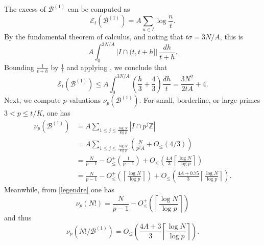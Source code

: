 \documentclass[12pt,a4paper,reqno]{amsart}
\numberwithin{equation}{section}
\theoremstyle{plain}
\theoremstyle{definition}
\newcommand\Z{\mathbb{Z}}
\newcommand\tuple{{\mathcal B}}
\newcommand\excess{{\mathcal{E}}}
\begin{document}
The excess of $\tuple^{(1)}$ can be computed as
$$ \excess_t(\tuple^{(1)}) = A \sum_{n \in I} \log \frac{n}{t}.$$
By the fundamental theorem of calculus, and noting that $t\sigma = 3N/A$, this is
$$ A \int_0^{3N/A} |I \cap (t, t+h]|\ \frac{dh}{t+h}.$$
Bounding $\frac{1}{t+h}$ by $\frac{1}{t}$ and applying , we conclude that
\begin{equation}\label{excess1-bound}
 \excess_t(\tuple^{(1)}) \leq A \int_0^{3N/A} \left(\frac{h}{3} + \frac{4}{3}\right) \frac{dh}{t} = \frac{3N^2}{2tA} + 4.
\end{equation}
Next, we compute $p$-valuations $\nu_p(\tuple^{(1)})$.  For small, borderline, or large primes $3 < p \leq t/K$, one has
\begin{align*}
  \nu_p(\tuple^{(1)}) &= A \sum_{1 \leq j \leq \frac{\log N}{\log p}} |I \cap p^j \Z| \\
  &= A \sum_{1 \leq j \leq \frac{\log N}{\log p}} \left(\frac{N}{p^j A} + O_{\leq}(4/3)\right) \\
  &= \frac{N}{p-1} - O_{\leq}^+\left(\frac{1}{p-1}\right)
  + O_{\leq}\left(\frac{4A}{3} \left\lceil \frac{\log N}{\log p}  \right\rceil\right) \\
  &= \frac{N}{p-1} 
  - O_{\leq}^+\left(\left\lceil \frac{\log N}{\log p}  \right\rceil\right)
  + O_{\leq}\left(\frac{4A+0.75}{3} \left\lceil \frac{\log N}{\log p}  \right\rceil\right).
\end{align*}
Meanwhile, from \eqref{legendre} one has
$$ \nu_p(N!) = \frac{N}{p-1} - O_{\leq}^+\left(\left\lceil \frac{\log N}{\log p}  \right\rceil\right)$$
and thus
\begin{equation}\label{nup} 
  \nu_p(N!/\tuple^{(1)}) =  
O_{\leq}\left(\frac{4A+3}{3} \left\lceil \frac{\log N}{\log p}  \right\rceil\right).
\end{equation}
\end{document}
